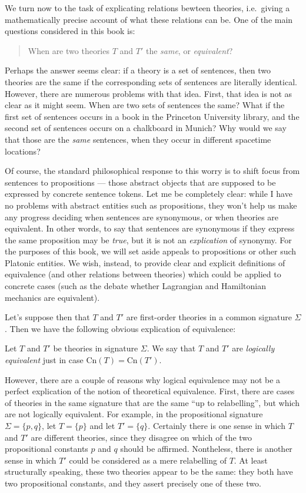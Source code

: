 We turn now to the task of explicating relations bewteen theories,
i.e.\ giving a mathematically precise account of what these relations
can be.  One of the main questions considered in this book is:
\begin{quote} When are two theories $T$ and $T'$ the \textit{same}, or
  \textit{equivalent}? \end{quote} Perhaps the answer seems clear: if
a theory is a set of sentences, then two theories are the same if the
corresponding sets of sentences are literally identical.  However,
there are numerous problems with that idea.  First, that idea is not
as clear as it might seem.  When are two sets of sentences the same?
What if the first set of sentences occurs in a book in the Princeton
University library, and the second set of sentences occurs on a
chalkboard in Munich?  Why would we say that those are the
\textit{same} sentences, when they occur in different spacetime
locations?

Of course, the standard philosophical response to this worry is to
shift focus from sentences to propositions --- those abstract objects
that are supposed to be expressed by concrete sentence tokens.  Let me
be completely clear: while I have no problems with abstract entities
such as propositions, they won't help us make any progress deciding
when sentences are synonymous, or when theories are equivalent.  In
other words, to say that sentences are synonymous if they express the
same proposition may be {\it true}, but it is not an {\it explication}
of synonymy.  For the purposes of this book, we will set aside appeals
to propositions or other such Platonic entities.  We wish, instead, to
provide clear and explicit definitions of equivalence (and other
relations between theories) which could be applied to concrete cases
(such as the debate whether Lagrangian and Hamiltonian mechanics are
equivalent).

Let's suppose then that $T$ and $T'$ are first-order theories in a
common signature $\Sigma$.  Then we have the following obvious
explication of equivalence:

\begin{defn} Let $T$ and $T'$ be theories in signature $\Sigma$.  We
  say that $T$ and $T'$ are \emph{logically equivalent} just in case
  $\mathrm{Cn}(T)=\mathrm{Cn}(T')$. \end{defn}

However, there are a couple of reasons why logical equivalence may not
be a perfect explication of the notion of theoretical equivalence.
First, there are cases of theories in the same signature that are the
same ``up to relabelling'', but which are not logically equivalent.
For example, in the propositional signature $\Sigma = \{ p,q\}$, let
$T=\{ p\}$ and let $T'=\{ q\}$.  Certainly there is one sense in which
$T$ and $T'$ are different theories, since they disagree on which of
the two propositional constants $p$ and $q$ should be affirmed.
Nontheless, there is another sense in which $T'$ could be considered
as a mere relabelling of $T$.  At least structurally speaking, these
two theories appear to be the same: they both have two propositional
constants, and they assert precisely one of these two.

